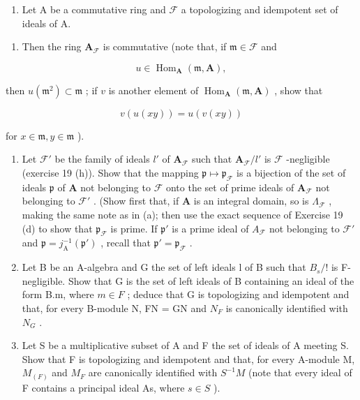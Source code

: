 \begin{enumerate}
\def\labelenumi{\arabic{enumi}.}
\setcounter{enumi}{20}
\tightlist
\item
  Let A be a commutative ring and \(\mathcal{F}\) a topologizing and idempotent set of ideals of A.
\end{enumerate}

\begin{enumerate}
\def\labelenumi{(\alph{enumi})}
\tightlist
\item
  Then the ring \(\mathbf{A}_{\mathcal{F}}\) is commutative (note that, if \(\mathfrak{m} \in \mathcal{F}\) and
\end{enumerate}

\[
u \in \operatorname{Hom} _ {\mathbf {A}} (\mathfrak {m}, \mathbf {A}),
\]

then \(u(\mathfrak{m}^2) \subset \mathfrak{m}\) ; if \(v\) is another element of \(\operatorname{Hom}_{\mathbf{A}}(\mathfrak{m}, \mathbf{A})\) , show that

\[
v (u (x y)) = u (v (x y))
\]

for \(x \in \mathfrak{m}, y \in \mathfrak{m}\) ).

\begin{enumerate}
\def\labelenumi{(\alph{enumi})}
\setcounter{enumi}{1}
\item
  Let \(\mathcal{F}'\) be the family of ideals \(l'\) of \(\mathbf{A}_{\mathcal{F}}\) such that \(\mathbf{A}_{\mathcal{F}} / l'\) is \(\mathcal{F}\) -negligible (exercise 19 (h)). Show that the mapping \(\mathfrak{p} \mapsto \mathfrak{p}_{\mathcal{F}}\) is a bijection of the set of ideals \(\mathfrak{p}\) of \(\mathbf{A}\) not belonging to \(\mathcal{F}\) onto the set of prime ideals of \(\mathbf{A}_{\mathcal{F}}\) not belonging to \(\mathcal{F}'\) . (Show first that, if \(\mathbf{A}\) is an integral domain, so is \(\Lambda_{\mathcal{F}}\) , making the same note as in (a); then use the exact sequence of Exercise 19 (d) to show that \(\mathfrak{p}_{\mathcal{F}}\) is prime. If \(\mathfrak{p}'\) is a prime ideal of \(A_{\mathcal{F}}\) not belonging to \(\mathcal{F}'\) and \(\mathfrak{p} = j_{\mathrm{A}}^{-1}(\mathfrak{p}')\) , recall that \(\mathfrak{p}' = \mathfrak{p}_{\mathcal{F}}\) .
\item
  Let B be an A-algebra and G the set of left ideals l of B such that \(B_{s}/!\) is F-negligible. Show that G is the set of left ideals of B containing an ideal of the form B.m, where \(m \in F\) ; deduce that G is topologizing and idempotent and that, for every B-module N, FN = GN and \(N_{F}\) is canonically identified with \(N_{G}\) .
\item
  Let S be a multiplicative subset of A and F the set of ideals of A meeting S. Show that F is topologizing and idempotent and that, for every A-module M, \(M_{(F)}\) and \(M_{F}\) are canonically identified with \(S^{-1}M\) (note that every ideal of F contains a principal ideal As, where \(s \in S\) ).
\end{enumerate}

